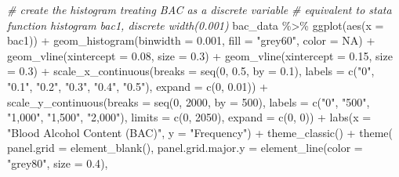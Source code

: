 \documentclass[
  11pt,
]{article}
\newenvironment{Shaded}{\begin{snugshade}}{\end{snugshade}}
\newcommand{\AttributeTok}[1]{\textcolor[rgb]{0.77,0.63,0.00}{#1}}
\newcommand{\CommentTok}[1]{\textcolor[rgb]{0.56,0.35,0.01}{\textit{#1}}}
\newcommand{\ConstantTok}[1]{\textcolor[rgb]{0.00,0.00,0.00}{#1}}
\newcommand{\DecValTok}[1]{\textcolor[rgb]{0.00,0.00,0.81}{#1}}
\newcommand{\FloatTok}[1]{\textcolor[rgb]{0.00,0.00,0.81}{#1}}
\newcommand{\FunctionTok}[1]{\textcolor[rgb]{0.00,0.00,0.00}{#1}}
\newcommand{\NormalTok}[1]{#1}
\newcommand{\SpecialCharTok}[1]{\textcolor[rgb]{0.00,0.00,0.00}{#1}}
\newcommand{\StringTok}[1]{\textcolor[rgb]{0.31,0.60,0.02}{#1}}
\begin{document}
\begin{Shaded}
\begin{Highlighting}[]
\CommentTok{\# create the histogram treating BAC as a discrete variable}
\CommentTok{\# equivalent to stata function histogram bac1, discrete width(0.001)}
\NormalTok{bac\_data }\SpecialCharTok{\%\textgreater{}\%} 
  \FunctionTok{ggplot}\NormalTok{(}\FunctionTok{aes}\NormalTok{(}\AttributeTok{x =}\NormalTok{ bac1)) }\SpecialCharTok{+}
  \FunctionTok{geom\_histogram}\NormalTok{(}\AttributeTok{binwidth =} \FloatTok{0.001}\NormalTok{, }\AttributeTok{fill =} \StringTok{"grey60"}\NormalTok{, }\AttributeTok{color =} \ConstantTok{NA}\NormalTok{) }\SpecialCharTok{+} 
  \FunctionTok{geom\_vline}\NormalTok{(}\AttributeTok{xintercept =} \FloatTok{0.08}\NormalTok{, }\AttributeTok{size =} \FloatTok{0.3}\NormalTok{) }\SpecialCharTok{+}
  \FunctionTok{geom\_vline}\NormalTok{(}\AttributeTok{xintercept =} \FloatTok{0.15}\NormalTok{, }\AttributeTok{size =} \FloatTok{0.3}\NormalTok{) }\SpecialCharTok{+}
  \FunctionTok{scale\_x\_continuous}\NormalTok{(}\AttributeTok{breaks =} \FunctionTok{seq}\NormalTok{(}\DecValTok{0}\NormalTok{, }\FloatTok{0.5}\NormalTok{, }\AttributeTok{by =} \FloatTok{0.1}\NormalTok{), }
                     \AttributeTok{labels =} \FunctionTok{c}\NormalTok{(}\StringTok{"0"}\NormalTok{, }\StringTok{"0.1"}\NormalTok{, }\StringTok{"0.2"}\NormalTok{, }\StringTok{"0.3"}\NormalTok{, }\StringTok{"0.4"}\NormalTok{, }\StringTok{"0.5"}\NormalTok{),}
                     \AttributeTok{expand =} \FunctionTok{c}\NormalTok{(}\DecValTok{0}\NormalTok{, }\FloatTok{0.01}\NormalTok{)) }\SpecialCharTok{+}
  \FunctionTok{scale\_y\_continuous}\NormalTok{(}\AttributeTok{breaks =} \FunctionTok{seq}\NormalTok{(}\DecValTok{0}\NormalTok{, }\DecValTok{2000}\NormalTok{, }\AttributeTok{by =} \DecValTok{500}\NormalTok{),}
                     \AttributeTok{labels =} \FunctionTok{c}\NormalTok{(}\StringTok{"0"}\NormalTok{, }\StringTok{"500"}\NormalTok{, }\StringTok{"1,000"}\NormalTok{, }\StringTok{"1,500"}\NormalTok{, }\StringTok{"2,000"}\NormalTok{),}
                     \AttributeTok{limits =} \FunctionTok{c}\NormalTok{(}\DecValTok{0}\NormalTok{, }\DecValTok{2050}\NormalTok{),}
                     \AttributeTok{expand =} \FunctionTok{c}\NormalTok{(}\DecValTok{0}\NormalTok{, }\DecValTok{0}\NormalTok{)) }\SpecialCharTok{+}
  \FunctionTok{labs}\NormalTok{(}\AttributeTok{x =} \StringTok{"Blood Alcohol Content (BAC)"}\NormalTok{, }\AttributeTok{y =} \StringTok{"Frequency"}\NormalTok{) }\SpecialCharTok{+}
  \FunctionTok{theme\_classic}\NormalTok{() }\SpecialCharTok{+}
  \FunctionTok{theme}\NormalTok{(}
    \AttributeTok{panel.grid =} \FunctionTok{element\_blank}\NormalTok{(),}
    \AttributeTok{panel.grid.major.y =} \FunctionTok{element\_line}\NormalTok{(}\AttributeTok{color =} \StringTok{"grey80"}\NormalTok{, }\AttributeTok{size =} \FloatTok{0.4}\NormalTok{),}

\end{Highlighting}
\end{Shaded}
\end{document}
